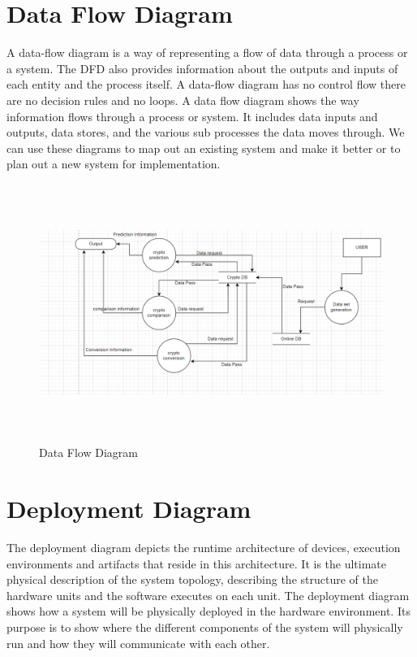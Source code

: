 \documentclass[openany,12pt]{report}
\begin{document}
\newpage
\section{Data Flow Diagram}
A data-flow diagram is a way of representing a flow of data through a process or a system. The DFD also provides information about the outputs and inputs of each entity and the process itself. A data-flow diagram has no control flow there are no decision rules and no loops.
A data flow diagram shows the way information flows through a process or system. It includes data inputs and outputs, data stores, and the various sub processes the data moves through. We can use these diagrams to map out an existing system and make it better or to plan out a new system for implementation.

\begin{figure}[H]
\centering
\includegraphics[width=5in,height=3.3in]{./Data Flow Diagram.png}
\caption{Data Flow Diagram}
\end{figure}

\newpage
\section{Deployment Diagram}
The deployment diagram depicts the runtime architecture of devices, execution environments and artifacts that reside in this architecture. It is the ultimate physical description of the system topology, describing the structure of the hardware units and the software executes on each unit. The deployment diagram shows how a system will be physically deployed in the hardware environment. Its purpose is to show where the different components of the system will physically run and how they will communicate with each other.
\end{document}

